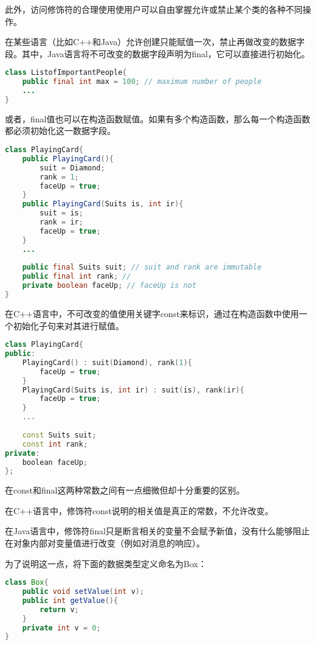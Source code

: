 此外，访问修饰符的合理使用使用户可以自由掌握允许或禁止某个类的各种不同操作。

在某些语言（比如C++和Java）允许创建只能赋值一次，禁止再做改变的数据字段。其中，Java语言将不可改变的数据字段声明为final，它可以直接进行初始化。




\begin{lstlisting}[language=Java]
class ListofImportantPeople{
	public final int max = 100; // maximum number of people
	...
}
\end{lstlisting}

或者，final值也可以在构造函数赋值。如果有多个构造函数，那么每一个构造函数都必须初始化这一数据字段。



\begin{lstlisting}[language=Java]
class PlayingCard{
	public PlayingCard(){
		suit = Diamond;
		rank = 1;
		faceUp = true;
	}
	public PlayingCard(Suits is, int ir){
		suit = is;
		rank = ir;
		faceUp = true;
	}
	...
	
	public final Suits suit; // suit and rank are immutable
	public final int rank; // 
	private boolean faceUp; // faceUp is not
}
\end{lstlisting}

在C++语言中，不可改变的值使用关键字const来标识，通过在构造函数中使用一个初始化子句来对其进行赋值。


\begin{lstlisting}[language=C++]
class PlayingCard{
public:
	PlayingCard() : suit(Diamond), rank(1){
		faceUp = true;
	}
	PlayingCard(Suits is, int ir) : suit(is), rank(ir){
		faceUp = true;
	}
	...
	
	const Suits suit;
	const int rank;
private:
	boolean faceUp;
};
\end{lstlisting}

在const和final这两种常数之间有一点细微但却十分重要的区别。

\begin{compactitem}
\item 在C++语言中，修饰符const说明的相关值是真正的常数，不允许改变。
\item 在Java语言中，修饰符final只是断言相关的变量不会赋予新值，没有什么能够阻止在对象内部对变量值进行改变（例如对消息的响应）。
\end{compactitem}

为了说明这一点，将下面的数据类型定义命名为Box：

\begin{lstlisting}[language=Java]
class Box{
	public void setValue(int v);
	public int getValue(){
		return v;
	}
	private int v = 0;
}
\end{lstlisting}

